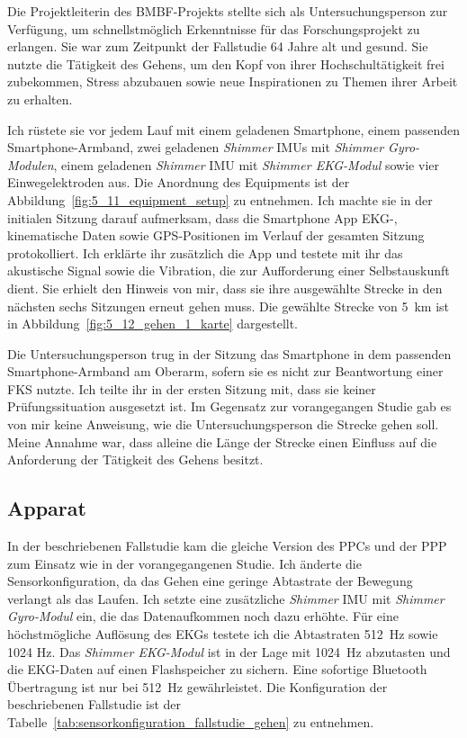 Die Projektleiterin des \acs{BMBF}-Projekts stellte sich als Untersuchungsperson zur Verfügung, um schnellstmöglich Erkenntnisse für das Forschungsprojekt zu erlangen. Sie war zum Zeitpunkt der Fallstudie 64 Jahre alt und gesund. Sie nutzte die Tätigkeit des Gehens, um den Kopf von ihrer Hochschultätigkeit frei zubekommen, Stress abzubauen sowie neue Inspirationen zu Themen ihrer Arbeit zu erhalten.

Ich rüstete sie vor jedem Lauf mit einem geladenen Smartphone, einem passenden Smartphone-Armband, zwei geladenen \emph{Shimmer} \acp{IMU} mit \emph{Shimmer Gyro-Modulen}, einem geladenen \emph{Shimmer} \ac{IMU} mit \emph{Shimmer EKG-Modul} sowie vier Einwegelektroden aus. Die Anordnung des Equipments ist der Abbildung~\ref{fig:5_11_equipment_setup} zu entnehmen. Ich machte sie in der initialen Sitzung darauf aufmerksam, dass die Smartphone App \ac{EKG}-, kinematische Daten sowie \ac{GPS}-Positionen im Verlauf der gesamten Sitzung protokolliert. Ich erklärte ihr zusätzlich die App und testete mit ihr das akustische Signal sowie die Vibration, die zur Aufforderung einer Selbstauskunft dient. Sie erhielt den Hinweis von mir, dass sie ihre ausgewählte Strecke in den nächsten sechs Sitzungen erneut gehen muss. Die gewählte Strecke von 5~km ist in Abbildung~\ref{fig:5_12_gehen_1_karte} dargestellt.

Die Untersuchungsperson trug in der Sitzung das Smartphone in dem passenden Smartphone-Armband am Oberarm, sofern sie es nicht zur Beantwortung einer \ac{FKS} nutzte. Ich teilte ihr in der ersten Sitzung mit, dass sie keiner Prüfungssituation ausgesetzt ist. Im Gegensatz zur vorangegangen Studie gab es von mir keine Anweisung, wie die Untersuchungsperson die Strecke gehen soll. Meine Annahme war, dass alleine die Länge der Strecke einen Einfluss auf die Anforderung der Tätigkeit des Gehens besitzt.

\subsection{Apparat}
In der beschriebenen Fallstudie kam die gleiche Version des \ac{PPC}s und der \ac{PPP} zum Einsatz wie in der vorangegangenen Studie. Ich änderte die Sensorkonfiguration, da das Gehen eine geringe Abtastrate der Bewegung verlangt als das Laufen. Ich setzte eine zusätzliche \emph{Shimmer} \ac{IMU} mit \emph{Shimmer Gyro-Modul} ein, die das Datenaufkommen noch dazu erhöhte. Für eine höchstmögliche Auflösung des \ac{EKG}s testete ich die Abtastraten 512~Hz sowie 1024 Hz. Das \emph{Shimmer EKG-Modul} ist in der Lage mit 1024~Hz abzutasten und die \ac{EKG}-Daten auf einen Flashspeicher zu sichern. Eine sofortige Bluetooth Übertragung ist nur bei 512~Hz gewährleistet. Die Konfiguration der beschriebenen Fallstudie ist der Tabelle~\ref{tab:sensorkonfiguration_fallstudie_gehen} zu entnehmen.

